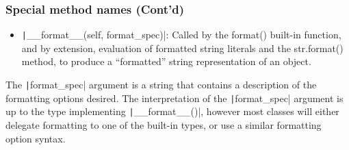 \documentclass{../py-lecture}
\begin{document}
\begin{frame}
	\frametitle{Special method names (Cont'd)}
  \begin{itemize}
    \item \texttt|__format__(self, format_spec)|: Called by the format() built-in function, and by extension, evaluation of formatted string literals and the str.format() method, to produce a “formatted” string representation of an object.
  \end{itemize}
  \par
  The \texttt|format_spec| argument is a string that contains a description of the formatting options desired.
  The interpretation of the \texttt|format_spec| argument is up to the type implementing \texttt|__format__()|,
  however most classes will either delegate formatting to one of the built-in types, or use a similar formatting option syntax.

\end{frame}
\end{document}
